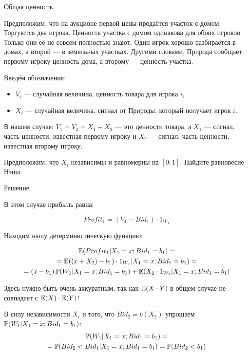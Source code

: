 \begin{myex} Общая ценность.

Предположим, что на аукционе первой цены продаётся участок с домом. Торгуются два игрока. Ценность участка с домом одинакова для обоих игроков. Только они её не совсем полностью знают. Один игрок хорошо разбирается в домах, а второй — в земельных участках. Другими словами, Природа сообщает первому игроку ценность дома, а второму — ценность участка.

Введём обозначения:

\begin{itemize}
\item $ V_{i} $ — случайная величина, ценность товара для игрока $ i $,
\item $ X_{i} $ — случайная величина, сигнал от Природы, который получает игрок $ i $.
\end{itemize}

В нашем случае: $ V_{1}=V_{2}=X_{1}+X_{2} $ — это ценности товара, а $ X_{1} $ — сигнал, часть ценности, известная первому игроку и $ X_{2} $ — сигнал, часть ценности, известная второму игроку.

Предположим, что $ X_{i} $ независимы и равномерны на $ [0;1] $. Найдите равновесие Нэша.

Решение.

В этом случае прибыль равна:

\begin{equation}
Profit_{1}=(V_{1}-Bid_{1})\cdot 1_{W_{1}}
\end{equation}

Находим нашу детерминистическую функцию:

\begin{multline}
\E(Profit_{1}|X_{1}=x; Bid_{1}=b_{1})=\\
=\E((x+X_{2})-b_{1})\cdot 1_{W_{1}}|X_{1}=x; Bid_{1}=b_{1})=\\
=(x-b_{1})\P(W_{1}|X_{1}=x; Bid_{1}=b_{1})+\E(X_{2}\cdot 1_{W_{1}}|X_{1}=x; Bid_{1}=b_{1})
\end{multline}


Здесь нужно быть очень аккуратным, так как $ \E(X\cdot Y) $ в общем случае не совпадает с $ \E(X)\cdot \E(Y) $!

В силу независимости $ X_{i} $ и того, что $ Bid_{2}=b(X_{2}) $ упрощаем $\P(W_{1}|X_{1}=x ; Bid_{1}=b_{1})$:
\begin{multline}
\P(W_{1}|X_{1}=x; Bid_{1}=b_{1})=\\
=\P(Bid_{2}<Bid_{1}|X_{1}=x; Bid_{1}=b_{1})=\P(Bid_{2}<b_{1})
\end{multline}


\end{myex}
